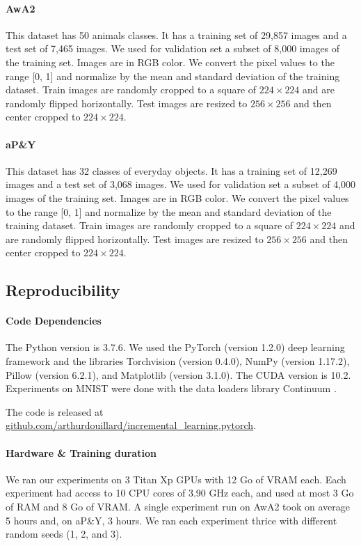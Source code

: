 \paragraph{AwA2} This dataset has 50 animals classes. It has a training set of 29,857 images and a
test set of 7,465 images. We used for validation set a subset of 8,000 images of the training set.
Images are in RGB color. We convert the pixel values to the range [0, 1] and normalize by the mean
and standard deviation of the training dataset. Train images are randomly cropped to a square of
$224\times224$ and are randomly flipped horizontally. Test images are resized to $256\times256$ and
then center cropped to $224\times224$.

\paragraph{aP\&Y} This dataset has 32 classes of everyday objects. It has a training set of 12,269
images and a test set of 3,068 images. We used for validation set a subset of 4,000 images of the
training set. Images are in RGB color. We convert the pixel values to the range [0, 1] and normalize
by the mean and standard deviation of the training dataset. Train images are randomly cropped to a
square of $224\times224$ and are randomly flipped horizontally. Test images are resized to
$256\times256$ and then center cropped to $224\times224$.

\subsection{Reproducibility}

\paragraph{Code Dependencies} The Python version is  3.7.6. We used the PyTorch
\cite{paszke2017pytorch} (version 1.2.0) deep learning framework and the libraries Torchvision
(version 0.4.0), NumPy \cite{oliphant2006numpy} (version 1.17.2), Pillow (version 6.2.1), and
Matplotlib \cite{hunter2007matplotlib} (version 3.1.0). The CUDA version is 10.2. Experiments on
MNIST were done with the data loaders library Continuum \cite{douillardlesort2021continuum}.

The code is released at
\href{https://github.com/arthurdouillard/incremental_learning.pytorch}{github.com/arthurdouillard/incremental\_learning.pytorch}.

\paragraph{Hardware \& Training duration} We ran our experiments on 3 Titan Xp GPUs with 12 Go of
VRAM each. Each experiment had access to 10 CPU cores of 3.90 GHz each, and used at most 3 Go of RAM
and 8 Go of VRAM. A single experiment run on AwA2 took on average 5 hours and, on aP\&Y, 3 hours. We
ran each experiment thrice with different random seeds (1, 2, and 3).

